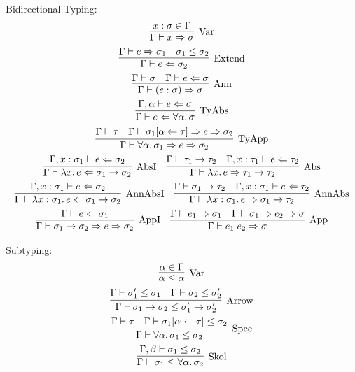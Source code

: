 Bidirectional Typing:
\begin{gather*}
  \infer[\text{Var}]{
    \Gamma \vdash x \Rightarrow \sigma
  }{
    x: \sigma \in \Gamma
  }
  \\
  \infer[\text{Extend}]{
    \Gamma \vdash e \Leftarrow \sigma_2
  }{
    \Gamma \vdash e \Rightarrow \sigma_1
    &
    \sigma_1 \leq \sigma_2
  }
  \\
  \infer[\text{Ann}]{
    \Gamma \vdash (e: \sigma) \Rightarrow \sigma
  }{
    \Gamma \vdash \sigma
    &
    \Gamma \vdash e \Leftarrow \sigma
  }
  \\
  \infer[\text{TyAbs}]{
    \Gamma \vdash e \Leftarrow \forall \alpha\ldotp \sigma
  }{
    \Gamma, \alpha \vdash e \Leftarrow \sigma
  }
  \\
  \infer[\text{TyApp}]{
    \Gamma \vdash \forall \alpha\ldotp \sigma_1 \Rightarrow e \Rightarrow \sigma_2
  }{
    \Gamma \vdash \tau
    &
    \Gamma \vdash \sigma_1[\alpha \assign \tau] \Rightarrow e \Rightarrow \sigma_2
  }
  \\
  \infer[\text{AbsI}]{
    \Gamma \vdash \lambda x\ldotp e \Leftarrow \sigma_1 \to \sigma_2
  }{
    \Gamma, x: \sigma_1 \vdash e \Leftarrow \sigma_2
  }
  \hspace{1em}
  \infer[\text{Abs}]{
    \Gamma \vdash \lambda x\ldotp e \Rightarrow \tau_1 \to \tau_2
  }{
    \Gamma \vdash \tau_1 \to \tau_2
    &
    \Gamma, x: \tau_1 \vdash e \Leftarrow \tau_2
  }
  \\
  \infer[\text{AnnAbsI}]{
    \Gamma \vdash \lambda x: \sigma_1\ldotp e \Leftarrow \sigma_1 \to \sigma_2
  }{
    \Gamma, x: \sigma_1 \vdash e \Leftarrow \sigma_2
  }
  \hspace{1em}
  \infer[\text{AnnAbs}]{
    \Gamma \vdash \lambda x: \sigma_1\ldotp e \Rightarrow \sigma_1 \to \tau_2
  }{
    \Gamma \vdash \sigma_1 \to \tau_2
    &
    \Gamma, x: \sigma_1 \vdash e \Leftarrow \tau_2
  }
  \\
  \infer[\text{AppI}]{
    \Gamma \vdash \sigma_1 \to \sigma_2 \Rightarrow e \Rightarrow \sigma_2
  }{
    \Gamma \vdash e \Leftarrow \sigma_1
  }
  \hspace{1em}
  \infer[\text{App}]{
    \Gamma \vdash e_1\; e_2 \Rightarrow \sigma
  }{
    \Gamma \vdash e_1 \Rightarrow \sigma_1
    &
    \Gamma \vdash \sigma_1 \Rightarrow e_2 \Rightarrow \sigma
  }
\end{gather*}

Subtyping:
\begin{gather*}
  \infer[\text{Var}]{
    \alpha \leq \alpha
  }{
    \alpha \in \Gamma
  }
  \\
  \infer[\text{Arrow}]{
    \Gamma \vdash \sigma_1 \to \sigma_2 \leq \sigma'_1 \to \sigma'_2
  }{
    \Gamma \vdash \sigma'_1 \leq \sigma_1
    &
    \Gamma \vdash \sigma_2 \leq \sigma'_2
  }
  \\
  \infer[\text{Spec}]{
    \Gamma \vdash \forall \alpha\ldotp \sigma_1 \leq \sigma_2
  }{
    \Gamma \vdash \tau
    &
    \Gamma \vdash \sigma_1[\alpha \assign \tau] \leq \sigma_2
  }
  \\
  \infer[\text{Skol}]{
    \Gamma \vdash \sigma_1 \leq \forall \alpha\ldotp \sigma_2
  }{
    \Gamma, \beta \vdash \sigma_1 \leq \sigma_2
  }
\end{gather*}


